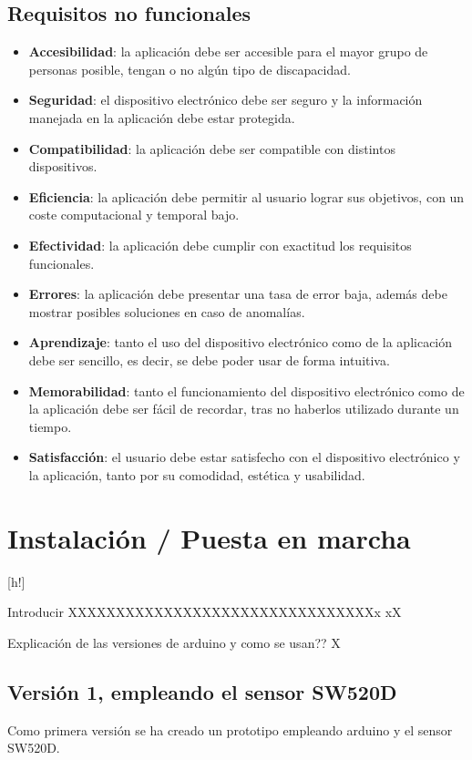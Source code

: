 \subsection{Requisitos no funcionales}
\begin{itemize}
    \item \textbf{Accesibilidad}: la aplicación debe ser accesible para el mayor grupo de personas posible, tengan o no algún tipo de discapacidad.
    \item \textbf{Seguridad}: el dispositivo electrónico debe ser seguro y la información manejada en la aplicación debe estar protegida.
    \item \textbf{Compatibilidad}: la aplicación debe ser compatible con distintos dispositivos.
    \item \textbf{Eficiencia}: la aplicación debe permitir al usuario lograr sus objetivos, con un coste computacional y temporal bajo.
    \item \textbf{Efectividad}: la aplicación debe cumplir con exactitud los requisitos funcionales. 
    \item \textbf{Errores}: la aplicación debe presentar una tasa de error baja, además debe mostrar posibles soluciones en caso de anomalías.
    \item \textbf{Aprendizaje}: tanto el uso del dispositivo electrónico como de la aplicación debe ser sencillo, es decir, se debe poder usar de forma intuitiva.
    \item \textbf{Memorabilidad}: tanto el funcionamiento del dispositivo electrónico como de la aplicación debe ser fácil de recordar, tras no haberlos utilizado durante un tiempo.
    \item \textbf{Satisfacción}: el usuario debe estar satisfecho con el dispositivo electrónico y la aplicación, tanto por su comodidad, estética y usabilidad.


\end{itemize}

\clearpage
\section{Instalación / Puesta en marcha}[h!]

Introducir XXXXXXXXXXXXXXXXXXXXXXXXXXXXXXXXx
xX

Explicación de las versiones de arduino y como se usan??
X
\subsection{Versión 1, empleando el sensor SW520D}
Como primera versión se ha creado un prototipo empleando arduino y el sensor SW520D.

